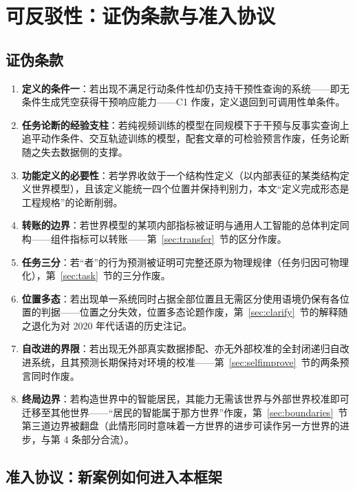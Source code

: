 \documentclass[10pt,fontset=fandol]{ctexart}
\begin{document}
\section{可反驳性：证伪条款与准入协议}\label{sec:falsifiable}

\subsection{证伪条款}\label{sec:falsification}

\begin{enumerate}
\item \textbf{定义的条件一}：若出现不满足行动条件性却仍支持干预性查询的系统——即无条件生成凭空获得干预响应能力——C1 作废，定义退回到可调用性单条件。
\item \textbf{任务论断的经验支柱}：若纯视频训练的模型在同规模下于干预与反事实查询上追平动作条件、交互轨迹训练的模型，配套文章的可检验预言作废\cite{yu2026worldmodelq}，任务论断随之失去数据侧的支撑。
\item \textbf{功能定义的必要性}：若学界收敛于一个结构性定义（以内部表征的某类结构定义世界模型），且该定义能统一四个位置并保持判别力，本文“定义完成形态是工程规格”的论断削弱。
\item \textbf{转账的边界}：若世界模型的某项内部指标被证明与通用人工智能的总体判定同构——组件指标可以转账——第~\ref{sec:transfer}~节的区分作废。
\item \textbf{任务三分}：若“者”的行为预测被证明可完整还原为物理规律（任务归因可物理化），第~\ref{sec:task}~节的三分作废。
\item \textbf{位置多态}：若出现单一系统同时占据全部位置且无需区分使用语境仍保有各位置的判据——位置之分失效，位置多态论题作废，第~\ref{sec:clarify}~节的解释随之退化为对 2020 年代话语的历史注记。
\item \textbf{自改进的界限}：若出现无外部真实数据掺配、亦无外部校准的全封闭递归自改进系统，且其预测长期保持对环境的校准——第~\ref{sec:selfimprove}~节的两条预言同时作废。
\item \textbf{终局边界}：若构造世界中的智能居民，其能力无需该世界与外部世界校准即可迁移至其他世界——“居民的智能属于那方世界”作废，第~\ref{sec:boundaries}~节第三道边界被翻盘（此情形同时意味着一方世界的进步可读作另一方世界的进步，与第 4 条部分合流）。
\end{enumerate}

\subsection{准入协议：新案例如何进入本框架}\label{sec:admission}
\end{document}

